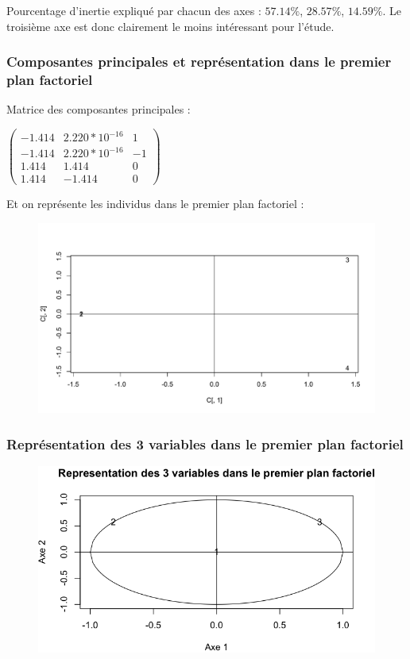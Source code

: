 \documentclass[a4paper,11pt]{article}
\newcommand{\InsertFigTitle}[2]{
\begin{figure}[H]
\caption{#2}
\begin{center}
\texttt{[image: img/\#1]}
\end{center}
\end{figure}}
\begin{document}
\noindent Pourcentage d'inertie expliqué par chacun des axes : $57.14 \%$, $28.57 \%$, $14.59 \%$. Le troisième axe est donc clairement le moins intéressant pour l'étude. 

\subsubsection{Composantes principales et représentation dans le premier plan factoriel}

\noindent Matrice des composantes principales : 
\begin{center}
$ \begin{pmatrix}
-1.414&2.220*10^{-16}&1\\
-1.414&2.220*10^{-16}&-1\\
1.414&1.414&0\\
1.414&-1.414&0
\end{pmatrix}$
\end{center}
\noindent Et on représente les individus dans le premier plan factoriel : 
\begin{figure}[H]
\begin{center}
\includegraphics[width=.6\textwidth]{img/premierplanfactoriel}
\end{center}
\end{figure}

\subsubsection{Représentation des 3 variables dans le premier plan factoriel}

\begin{figure}[H]
\begin{center}
\includegraphics[width=.6\textwidth]{img/ppf}
\end{center}
\end{figure}
\end{document}
